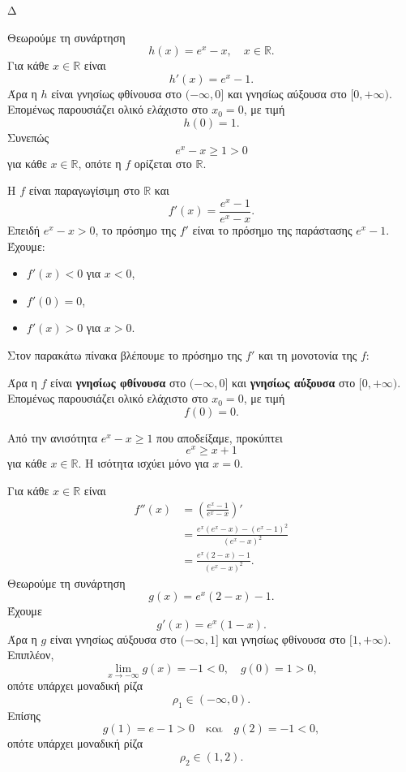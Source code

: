 \begin{thema}{Δ}
\begin{erwthma}
\item Θεωρούμε τη συνάρτηση
\[
h(x)=e^x-x,\quad x\in\mathbb{R}.
\]
Για κάθε $x\in\mathbb{R}$ είναι
\[
h'(x)=e^x-1.
\]
Άρα η $h$ είναι γνησίως φθίνουσα στο $(-\infty,0]$ και γνησίως αύξουσα στο $[0,+\infty)$. Επομένως παρουσιάζει ολικό ελάχιστο στο $x_0=0$, με τιμή
\[
h(0)=1.
\]
Συνεπώς
\[
e^x-x\geq1>0
\]
για κάθε $x\in\mathbb{R}$, οπότε η $f$ ορίζεται στο $\mathbb{R}$.

Η $f$ είναι παραγωγίσιμη στο $\mathbb{R}$ και
\[
f'(x)=\frac{e^x-1}{e^x-x}.
\]
Επειδή $e^x-x>0$, το πρόσημο της $f'$ είναι το πρόσημο της παράστασης $e^x-1$. Έχουμε:
\begin{itemize}
\item $f'(x)<0$ για $x<0$,
\item $f'(0)=0$,
\item $f'(x)>0$ για $x>0$.
\end{itemize}
Στον παρακάτω πίνακα βλέπουμε το πρόσημο της $f'$ και τη μονοτονία της $f$:
\begin{center}
\end{center}

Άρα η $f$ είναι \textbf{γνησίως φθίνουσα} στο $(-\infty,0]$ και \textbf{γνησίως αύξουσα} στο $[0,+\infty)$. Επομένως παρουσιάζει ολικό ελάχιστο στο $x_0=0$, με τιμή
\[
{f(0)=0}.
\]

Από την ανισότητα $e^x-x\geq1$ που αποδείξαμε, προκύπτει
\[
{e^x\geq x+1}
\]
για κάθε $x\in\mathbb{R}$. Η ισότητα ισχύει μόνο για $x=0$.

\item Για κάθε $x\in\mathbb{R}$ είναι
\begin{align*}
f''(x)
&=\left(\frac{e^x-1}{e^x-x}\right)'\\
&=\frac{e^x(e^x-x)-(e^x-1)^2}
{(e^x-x)^2}\\
&=\frac{e^x(2-x)-1}{(e^x-x)^2}.
\end{align*}
Θεωρούμε τη συνάρτηση
\[
g(x)=e^x(2-x)-1.
\]
Έχουμε
\[
g'(x)=e^x(1-x).
\]
Άρα η $g$ είναι γνησίως αύξουσα στο $(-\infty,1]$ και γνησίως φθίνουσα στο $[1,+\infty)$. Επιπλέον,
\[
\lim_{x\to-\infty}g(x)=-1<0,
\quad
g(0)=1>0,
\]
οπότε υπάρχει μοναδική ρίζα
\[
\rho_1\in(-\infty,0).
\]
Επίσης
\[
g(1)=e-1>0
\quad\text{και}\quad
g(2)=-1<0,
\]
οπότε υπάρχει μοναδική ρίζα
\[
\rho_2\in(1,2).
\]


\end{erwthma}
\end{thema}
